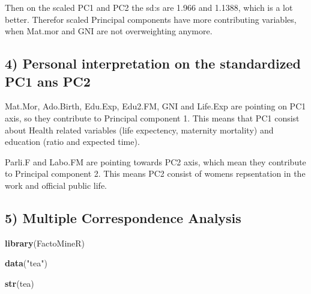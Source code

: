 \documentclass[]{article}
\newenvironment{Shaded}{\begin{snugshade}}{\end{snugshade}}
\newcommand{\KeywordTok}[1]{\textcolor[rgb]{0.13,0.29,0.53}{\textbf{#1}}}
\newcommand{\StringTok}[1]{\textcolor[rgb]{0.31,0.60,0.02}{#1}}
\newcommand{\NormalTok}[1]{#1}
\begin{document}
Then on the scaled PC1 and PC2 the sd:s are 1.966 and 1.1388, which is a
lot better. Therefor scaled Principal components have more contributing
variables, when Mat.mor and GNI are not overweighting anymore.

\subsection{4) Personal interpretation on the standardized PC1 ans
PC2}\label{personal-interpretation-on-the-standardized-pc1-ans-pc2}

Mat.Mor, Ado.Birth, Edu.Exp, Edu2.FM, GNI and Life.Exp are pointing on
PC1 axis, so they contribute to Principal component 1. This means that
PC1 consist about Health related variables (life expectency, maternity
mortality) and education (ratio and expected time).

Parli.F and Labo.FM are pointing towards PC2 axis, which mean they
contribute to Principal component 2. This means PC2 consist of womens
repsentation in the work and official public life.

\subsection{5) Multiple Correspondence
Analysis}\label{multiple-correspondence-analysis}

\begin{Shaded}
\begin{Highlighting}[]
\KeywordTok{library}\NormalTok{(FactoMineR)}

\KeywordTok{data}\NormalTok{(}\StringTok{"tea"}\NormalTok{)}

\KeywordTok{str}\NormalTok{(tea)}
\end{Highlighting}
\end{Shaded}
\end{document}
